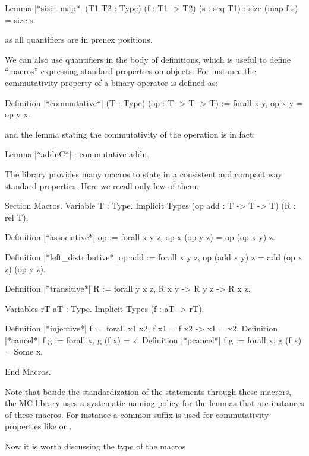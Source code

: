 \begin{coq}{}{}
Lemma |*size_map*| (T1 T2 : Type) (f : T1 -> T2) (s : seq T1) :
 size (map f s) = size s.
\end{coq}
as all quantifiers are in prenex positions.

We can also use quantifiers in the body of definitions, which is
useful to define ``macros'' expressing standard properties on
objects. For instance the commutativity property of a binary operator
is defined as:

\begin{coq}{}{}
Definition |*commutative*| (T : Type) (op : T -> T -> T) :=
  forall x y, op x y = op y x.
\end{coq}

and the lemma stating the commutativity of the  operation is
in fact:

\begin{coq}{}{}
Lemma |*addnC*| : commutative addn.
\end{coq}

The \mcbMC{} library provides many macros to state in a consistent
and compact way standard properties.  Here we recall only few of them.

\begin{coq}{}{}
Section Macros.
Variable T : Type.
Implicit Types (op add : T -> T -> T) (R : rel T).

Definition |*associative*| op :=
  forall x y z, op x (op y z) = op (op x y) z.

Definition |*left_distributive*| op add :=
  forall x y z, op (add x y) z = add (op x z) (op y z).

Definition |*transitive*| R :=
  forall y x z, R x y -> R y z -> R x z.


Variables rT aT : Type.
Implicit Types (f : aT -> rT).

Definition |*injective*| f :=
  forall x1 x2, f x1 = f x2 -> x1 = x2.
Definition |*cancel*| f g := forall x, g (f x) = x.
Definition |*pcancel*| f g := forall x, g (f x) = Some x.

End Macros.
\end{coq}

Note that beside the standardization of the statements through these
macrors, the MC library uses a systematic naming policy for the lemmas
that are instances of these macros. For instance a common suffix 
is used for commutativity properties like  or .

Now it is worth discussing the type of the macros

